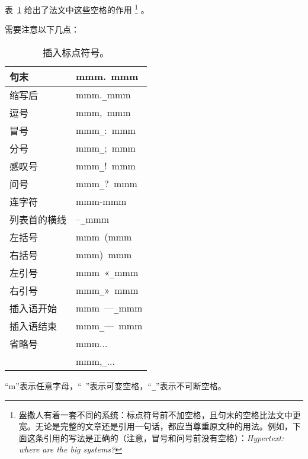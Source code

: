 表~\ref{tab1} 给出了法文中这些空格的作用
    \footnote{盎撒人有着一套不同的系统：标点符号前不加空格，且句末的空格比法文中更宽。无论是完整的文章还是引用一句话，都应当尊重原文种的用法。例如，下面这条引用的写法是正确的（注意，冒号和问号前没有空格）：\emph{Hypertext: where are the big systems?}}
。

需要注意以下几点：

\begin{table}
    \begin{center}
        \begin{tabular}{|l|l|}
            \hline
            句末 & mmm.\verb*| |mmm\\
            \hline
            缩写后 & mmm.\verb|_|mmm\\
            \hline
            逗号 & mmm,\verb*| |mmm\\
            \hline
            冒号 & mmm\verb|_|:\verb*| |mmm\\
            \hline
            分号 & mmm\verb|_|;\verb*| |mmm\\
            \hline
            感叹号 & mmm\verb|_|!\verb*| |mmm\\
            \hline
            问号 & mmm\verb|_|?\verb*| |mmm\\
            \hline
            连字符 & mmm-mmm\\
            \hline
            列表首的横线 & --\verb|_|mmm\\
            \hline
            左括号 & mmm\verb*| |(mmm\\
            右括号 & mmm)\verb*| |mmm\\
            \hline
            左引号 & mmm\verb*| |«\verb|_|mmm\\
            右引号 & mmm\verb|_|»\verb*| |mmm\\
            \hline
            插入语开始 & mmm\verb*| |---\verb|_|mmm\\
            插入语结束 & mmm\verb|_|---\verb*| |mmm\\
            \hline
            省略号 & mmm...\\
            & mmm,\verb|_|...\\
            \hline
        \end{tabular}
        \caption{插入标点符号。}
        \label{tab1}
        ``m''表示任意字母，``\verb*| |''表示可变空格，``\verb|_|''表示不可断空格。
    \end{center}
\end{table}

